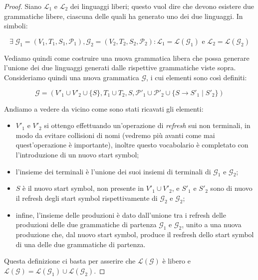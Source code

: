\documentclass[class=book, crop=false, oneside, 12pt]{standalone}
\begin{document}
\begin{proof}
    Siano \(\mathcal{L}_1\) e \(\mathcal{L}_2\) dei linguaggi liberi; questo vuol dire che devono esistere due grammatiche libere, ciascuna delle quali ha generato uno dei due linguaggi. In simboli:

  \begin{equation*}
    \exists\; \mathcal{G}_1 = (V_1, T_1, S_1, \mathcal{P}_1), \mathcal{G}_2 = (V_2, T_2, S_2, \mathcal{P}_2) : \mathcal{L}_1 = \mathcal{L}(\mathcal{G}_1) \textrm{ e } \mathcal{L}_2 = \mathcal{L}(\mathcal{G}_2)
  \end{equation*}

  Vediamo quindi come costruire una nuova grammatica libera che possa generare l'unione dei due linguaggi generati dalle rispettive grammatiche viste sopra. Consideriamo quindi una nuova grammatica \(\mathcal{G}\), i cui elementi sono così definiti:

  \begin{equation*}
      \mathcal{G} = (V'_1 \cup V'_2 \cup \{S\}, T_1 \cup T_2, S, \mathcal{P}'_1 \cup \mathcal{P}'_2 \cup \{S \rightarrow S'_1 \mid S'_2\})
  \end{equation*}

  \noindent Andiamo a vedere da vicino come sono stati ricavati gli elementi:

  \begin{itemize}
    \item \(V'_1\) e \(V'_2\) si ottengo effettuando un'operazione di \emph{refresh} sui non terminali, in modo da evitare collisioni di nomi (vedremo più avanti come mai quest'operazione è importante), inoltre questo vocabolario è completato con l'introduzione di un nuovo start symbol;
    \item l'insieme dei terminali è l'unione dei suoi insiemi di terminali di \(\mathcal{G}_1\) e \(\mathcal{G}_2\);
    \item \(S\) è il nuovo start symbol, non presente in \(V'_1 \cup V'_2\), e \(S'_1\) e \(S'_2\) sono di nuovo il refresh degli start symbol rispettivamente di \(\mathcal{G}_2\) e \(\mathcal{G}_2\);
    \item infine, l'insieme delle produzioni è dato dall'unione tra i refresh delle produzioni delle due grammatiche di partenza  \(\mathcal{G}_1\) e \(\mathcal{G}_2\), unito a una nuova produzione che, dal nuovo start symbol, produce il resfresh dello start symbol di una delle due grammatiche di partenza.
  \end{itemize}

  \noindent Questa definizione ci basta per asserire che \(\mathcal{L(G)}\) è libero e \(\mathcal{L(G)} = \mathcal{L}(\mathcal{G}_1)  \cup \mathcal{L}(\mathcal{G}_2) \).

\end{proof}
\end{document}
